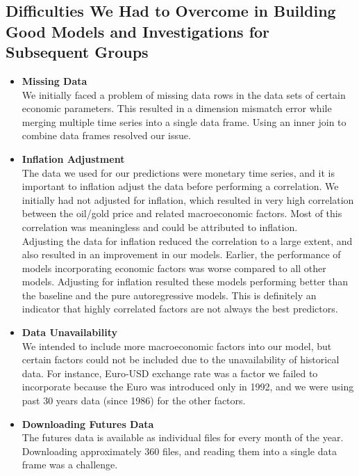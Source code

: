 \documentclass[runningheads]{llncs}
\begin{document}
\subsection {Difficulties We Had to Overcome in Building Good Models and Investigations for Subsequent Groups}

\begin{itemize}

\item \textbf{Missing Data} \\
We initially faced a problem of missing data rows in the data sets of certain economic parameters. This resulted in a dimension mismatch error while merging multiple time series into a single data frame. Using an inner join to combine data frames resolved our issue. \\

\item \textbf{Inflation Adjustment} \\
The data we used for our predictions were monetary time series, and it is important to inflation adjust the data before performing a correlation. We initially had not adjusted for inflation, which resulted in very high correlation between the oil/gold price and related macroeconomic factors. Most of this correlation was meaningless and could be attributed to inflation. \\

Adjusting the data for inflation reduced the correlation to a large extent, and also resulted in an improvement in our models. Earlier, the performance of models incorporating economic factors was worse compared to all other models. Adjusting for inflation resulted these models performing better than the baseline and the pure autoregressive models. This is definitely an indicator that highly correlated factors are not always the best predictors. \\

\item \textbf{Data Unavailability} \\
We intended to include more macroeconomic factors into our model, but certain factors could not be included due to the unavailability of historical data. For instance, Euro-USD exchange rate was a factor we failed to incorporate because the Euro was introduced only in 1992, and we were using past 30 years data (since 1986) for the other factors.  \\

\item \textbf{Downloading Futures Data} \\
The futures data is available as individual files for every month of the year. Downloading approximately 360 files, and reading them into a single data frame was a challenge. 


\end{itemize}
\end{document}
